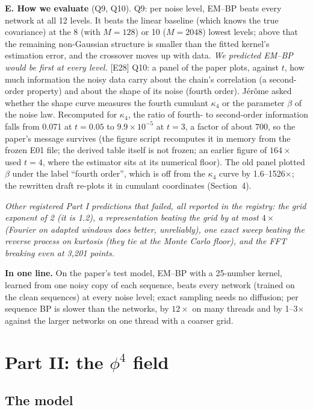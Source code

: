 \documentclass[11pt,a4paper]{article}
\newcommand{\key}[1]{\par\smallskip\noindent\colorbox{soft}{\parbox{\dimexpr\linewidth-2\fboxsep}{\small\textbf{In one line.} #1}}\par\smallskip}
\newcommand{\src}[1]{{\footnotesize\color{gray}[#1]}}
\newcommand{\fals}[1]{{\small\itshape #1}}
\begin{document}
\textbf{E. How we evaluate} (Q9, Q10). Q9: per noise level, EM--BP beats every network at all 12 levels. It beats the linear
baseline (which knows the true covariance) at the 8 (with $M=128$) or 10 ($M=2048$) lowest levels; above that the remaining
non-Gaussian structure is smaller than the fitted kernel's estimation error, and the crossover moves up with data. \fals{We
predicted EM--BP would be first at every level.} \src{E28}
Q10: a panel of the paper plots, against $t$, how much information the noisy data carry about the chain's correlation (a
second-order property) and about the shape of its noise (fourth order). Jérôme asked whether the shape curve measures the fourth
cumulant $\kappa_4$ or the parameter $\beta$ of the noise law. Recomputed for $\kappa_4$, the ratio of fourth- to second-order information falls from 0.071 at $t=0.05$ to $9.9\times10^{-5}$ at
$t=3$, a factor of about $700$, so the paper's message survives (the figure script recomputes it in memory from the frozen E01 file;
the derived table itself is not frozen; an earlier figure of $164\times$ used $t=4$, where the estimator sits at its numerical
floor). The old panel plotted $\beta$ under the label ``fourth order'', which is off from the $\kappa_4$ curve by 1.6--1526$\times$;
the rewritten draft re-plots it in cumulant coordinates (Section~4).

\fals{Other registered Part I predictions that failed, all reported in the registry: the grid exponent of 2 (it is 1.2), a
representation beating the grid by at most $4\times$ (Fourier on adapted windows does better, unreliably), one exact sweep beating
the reverse process on kurtosis (they tie at the Monte Carlo floor), and the FFT breaking even at 3,201 points.}

\key{On the paper's test model, EM--BP with a 25-number kernel, learned from one noisy copy of each sequence, beats every network
(trained on the clean sequences) at every noise level; exact sampling needs no diffusion; per sequence BP is slower than the
networks, by $12\times$ on many threads and by 1--3$\times$ against the larger networks on one thread with a coarser grid.}

\section{Part II: the $\phi^4$ field}

\subsection{The model}
\end{document}

